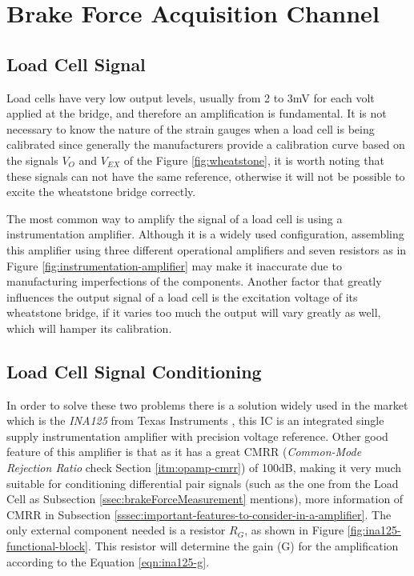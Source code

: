 \section{Brake Force Acquisition Channel}\label{sec:brake-pressure-acquisition-channel}

\subsection{Load Cell Signal}\label{ssec:load-cell-signal}

	Load cells have very low output levels, usually from 2 to 3mV for each volt applied at the bridge, and therefore an amplification is fundamental. It is not necessary to know the nature of the strain gauges when a load cell is being calibrated since generally the manufacturers provide a calibration curve based on the signals $V_{O}$ and $V_{EX}$ of the Figure \ref{fig:wheatstone}, it is worth noting that these signals can not have the same reference, otherwise it will not be possible to excite the wheatstone bridge correctly.
	\par
	The most common way to amplify the signal of a load cell is using a instrumentation amplifier. Although it is a widely used configuration, assembling this amplifier using three different operational amplifiers and seven resistors as in Figure \ref{fig:instrumentation-amplifier} may make it inaccurate due to manufacturing imperfections of the components. Another factor that greatly influences the output signal of a load cell is the excitation voltage of its wheatstone bridge, if it varies too much the output will vary greatly as well, which will hamper its calibration.

\subsection{Load Cell Signal Conditioning}\label{ssec:load-cell-signal-conditioning}
		
	In order to solve these two problems there is a solution widely used in the market which is the \textit{INA125} from Texas Instruments \cite{ina125}, this IC is an integrated single supply instrumentation amplifier with precision voltage reference. Other good feature of this amplifier is that as it has a great CMRR (\textit{Common-Mode Rejection Ratio} check Section \ref{itm:opamp-cmrr}) of 100dB, making it very much suitable for conditioning differential pair signals (such as the one from the Load Cell as Subsection \ref{ssec:brakeForceMeasurement} mentions), more information of CMRR in Subsection \ref{sssec:important-features-to-consider-in-a-amplifier}. The only external component needed is a resistor $R_{G}$, as shown in Figure \ref{fig:ina125-functional-block}. This resistor will determine the gain (G) for the amplification according to the Equation \ref{eqn:ina125-g}.
	

